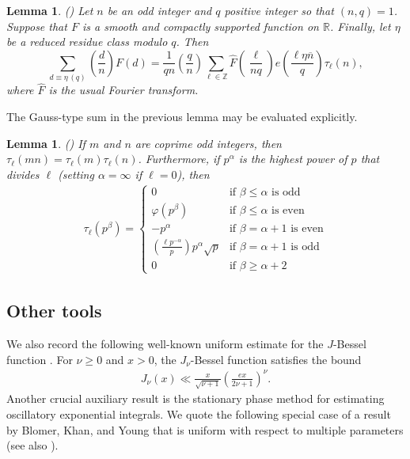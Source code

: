 \documentclass[a4paper,10pt,twoside]{amsart}
\newtheorem{lemma}[theorem]{Lemma}
\theoremstyle{definition}
\numberwithin{equation}{section}
\renewcommand\:{\colon}
\begin{document}
\begin{lemma}\label{Poisson-w-char} (\cite[Lemma 7.]{Radziwill-Soundararajan2015})
Let $n$ be an odd integer and $q$ positive integer so that $(n,q)=1$. Suppose that $F$ is a smooth and compactly supported function on $\mathbb R$. Finally, let $\eta$ be a reduced residue class modulo $q$. Then
\[\sum_{d\equiv\eta\,(q)}\left(\frac dn\right)F(d)=\frac1{qn}\left(\frac qn\right)\sum_{\ell\in\mathbb Z}\widehat F\left(\frac \ell{nq}\right)e\left(\frac{\ell\eta\overline n}q\right)\tau_\ell(n),\]
where $\widehat F$ is the usual Fourier transform.
\end{lemma}
\noindent The Gauss-type sum in the previous lemma may be evaluated explicitly.

\begin{lemma}\label{Gauss-type-sum} (\cite[Lemma 2.3.]{Soundararajan2000})
If $m$ and $n$ are coprime odd integers, then $\tau_\ell(mn)=\tau_\ell(m)\tau_\ell(n)$. Furthermore, if $p^\alpha$ is the highest power of $p$ that divides $\ell$ (setting $\alpha=\infty$ if $\ell=0$), then
\begin{align}
\tau_\ell\left(p^\beta\right)=\begin{cases}
0 & \text{if }\beta\leq\alpha\text{ is odd} \\
\varphi(p^\beta) & \text{if }\beta\leq\alpha\text{ is even} \\
-p^\alpha & \text{if }\beta=\alpha+1\text{ is even} \\
\left(\frac{\ell p^{-\alpha}}p\right)p^\alpha\sqrt p & \text{if }\beta=\alpha+1 \text{ is odd} \\
0 & \text{if }\beta\geq\alpha+2
\end{cases}
\end{align} 
\end{lemma}

\subsection{Other tools}

\noindent We also record the following well-known uniform estimate for the $J$-Bessel function \cite[(2.11'')]{Iwaniec-Luo-Sarnak2000}. For $\nu\geq 0$ and $x>0$, the $J_\nu$-Bessel function satisfies the bound 
\begin{align}\label{J-Bessel}
J_\nu(x)\ll\frac x{\sqrt{\nu+1}}\left(\frac{ex}{2\nu+1}\right)^\nu.
\end{align}
Another crucial auxiliary result is the stationary phase method for estimating oscillatory exponential integrals. We quote the following special case of a result \cite[Proposition 8.2.]{Blomer-Khan-Young2013} by Blomer, Khan, and Young that is uniform with respect to multiple parameters (see also \cite[Lemma 5.6.]{Zenz}).
\end{document}
